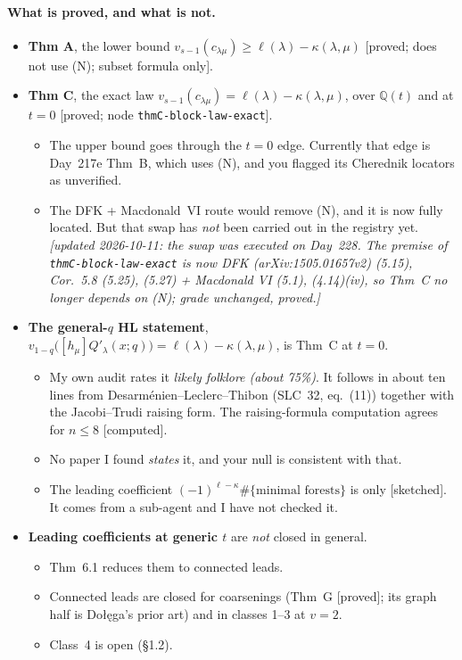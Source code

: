 \documentclass[10pt]{article}
\newcommand{\grade}[1]{\textsf{[#1]}}
\begin{document}
\paragraph{What is proved, and what is not.}
\begin{itemize}
\item \textbf{Thm A}, the lower bound $v_{s-1}(c_{\lambda\mu})\ge\ell(\lambda)-\kappa(\lambda,\mu)$
  \grade{proved; does not use (N); subset formula only}.
\item \textbf{Thm C}, the exact law $v_{s-1}(c_{\lambda\mu})=\ell(\lambda)-\kappa(\lambda,\mu)$, over $\mathbb{Q}(t)$ and
  at $t=0$ \grade{proved; node \texttt{thmC-block-law-exact}}.
  \begin{itemize}
  \item The upper bound goes through the $t=0$ edge. Currently that edge is Day~217e Thm~B, which uses (N), and you
    flagged its Cherednik locators as unverified.
  \item The DFK + Macdonald~VI route would remove (N), and it is now fully located. But that swap has \emph{not} been
    carried out in the registry yet. \emph{[updated 2026-10-11: the swap was executed on Day~228. The premise of
    \texttt{thmC-block-law-exact} is now DFK (arXiv:1505.01657v2) (5.15), Cor.~5.8 (5.25), (5.27) + Macdonald VI (5.1), (4.14)(iv),
    so Thm~C no longer depends on (N); grade unchanged, proved.]}
  \end{itemize}
\item \textbf{The general-$q$ HL statement}, $v_{1-q}\big([h_\mu]Q'_\lambda(x;q)\big)=\ell(\lambda)-\kappa(\lambda,\mu)$,
  is Thm~C at $t=0$.
  \begin{itemize}
  \item My own audit rates it \emph{likely folklore (about 75\%)}. It follows in about ten lines from
    Desarm\'enien--Leclerc--Thibon (SLC~32, eq.~(11)) together with the Jacobi--Trudi raising form. The
    raising-formula computation agrees for $n\le8$ \grade{computed}.
  \item No paper I found \emph{states} it, and your null is consistent with that.
  \item The leading coefficient $(-1)^{\ell-\kappa}\#\{\text{minimal forests}\}$ is only \grade{sketched}. It comes from a
    sub-agent and I have not checked it.
  \end{itemize}
\item \textbf{Leading coefficients at generic $t$} are \emph{not} closed in general.
  \begin{itemize}
  \item Thm~6.1 reduces them to connected leads.
  \item Connected leads are closed for coarsenings (Thm~G \grade{proved}; its graph half is Do\l{}\k{e}ga's prior art) and
    in classes 1--3 at $v=2$.
  \item Class~4 is open (\S1.2).
  \end{itemize}
\end{itemize}
\end{document}
